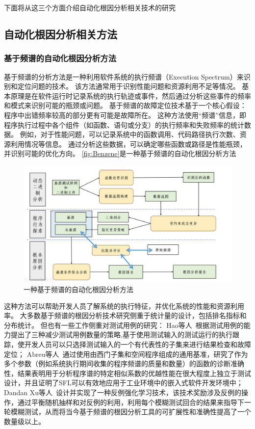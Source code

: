 下面将从这三个方面介绍自动化根因分析相关技术的研究
\subsection{自动化根因分析相关方法}
\subsubsection{基于频谱的自动化根因分析方法}
基于频谱的分析方法是一种利用软件系统的执行频谱（Execution Spectrum）来识别和定位问题的技术。
该方法通常用于识别性能问题和资源利用不足等情况。
基本原理是在软件运行时记录系统的执行轨迹或事件，然后通过分析这些事件的频率和模式来识别可能的瓶颈或问题。
基于频谱的故障定位技术基于一个核心假设：程序中出错频率较高的部分更有可能是故障所在。
这种方法使用“频谱”信息，即程序执行过程中各个组件（如函数、语句或分支）的执行频率和失败频率的统计数据。
例如，对于性能问题，可以记录系统中的函数调用、代码路径执行次数、资源利用情况等信息。
通过分析这些数据，可以确定哪些函数或路径是性能瓶颈，并识别可能的优化方向。
\autoref{fig:Benzene}是一种基于频谱的自动化根因分析方法~\cite{BENZENE}
\begin{figure}[h]
    \centering
    \includegraphics[width=1.0\textwidth]{./figure/Benzene.png}
    \caption{一种基于频谱的自动化根因分析方法}
    \label{fig:Benzene}
\end{figure}


这种方法可以帮助开发人员了解系统的执行特征，并优化系统的性能和资源利用率。
大多数基于频谱的根因分析技术研究侧重于统计量的设计，包括排名指标和分布统计。
但也有一些工作侧重对测试用例的研究：
Hao等人~\cite{Test2010}根据测试用例的能力提出了三种减少测试用例数量的策略,基于使用测试输入的测试运行的执行跟踪，使开发人员可以只选择测试输入的一个有代表性的子集来进行结果检查和故障定位；
Abreu等人~\cite{practical2009}通过使用由西门子集和空间程序组成的通用基准，研究了作为多个参数（例如系统执行期间收集的程序频谱的质量和数量）的函数的诊断准确性，结果表明用于分析程序谱的特定相似系数的优越性能在很大程度上独立于测试设计，并且证明了SFL可以有效地应用于工业环境中的嵌入式软件开发环境中；
Dandan Xu等人~\cite{Racing}设计并实现了一种反例强化学习技术，该技术奖励涉及反例的操作，通过平衡随机抽样和对反例的利用，利用每个模糊测试回合的结果来指导下一轮模糊测试，从而将当今基于频谱的根因分析工具的可扩展性和准确性提高了一个数量级以上。

